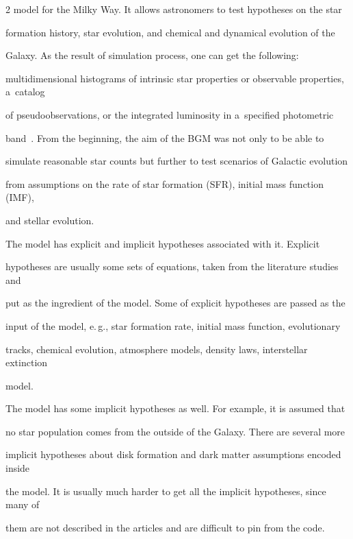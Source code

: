 \begin{multicols}{2}
model for the Milky Way. It allows astronomers to test hypotheses on the star


formation history, star evolution, and chemical and dynamical evolution of the


Galaxy.  As the result of simulation process, one can get the following:


multidimensional histograms of intrinsic star properties or observable properties, a~catalog


of pseudoobservations, or the integrated luminosity in a~specified photometric


band~\cite{60-kl}. From the beginning, the aim of the BGM was not only to be able to


simulate reasonable star counts but further to test scenarios of Galactic evolution


from assumptions on the rate of star formation (SFR), initial mass function (IMF),


and stellar evolution.





  The model has explicit and implicit hypotheses associated with it. Explicit


hypotheses are usually some sets of equations, taken from the literature studies and


put as the ingredient of the model. Some of explicit hypotheses are passed as the


input of the model, e.\,g., star formation rate, initial mass function, evolutionary


tracks, chemical evolution, atmosphere models, density laws, interstellar extinction


model.





  The model has some implicit hypotheses as well. For example, it is assumed that


no star population comes from the outside of the Galaxy. There are several more


implicit hypotheses about disk formation and dark matter assumptions encoded inside


the model. It is usually much harder to get all the implicit hypotheses, since many of


them are not described in the articles and are difficult to pin from the code.






\end{multicols}
